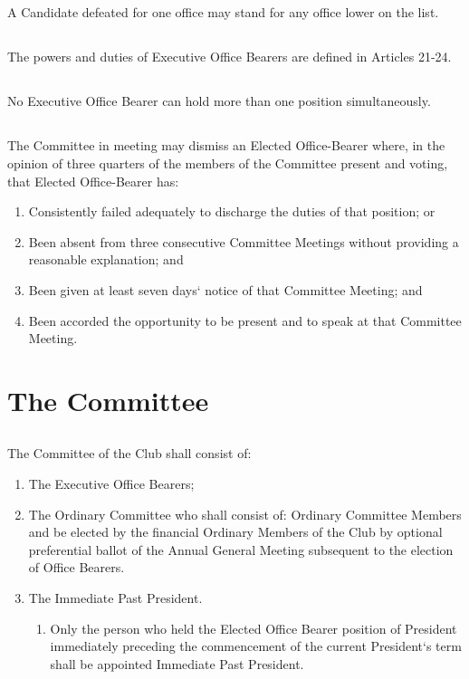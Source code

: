 \documentclass[10.5pt]{article}
\begin{document}
\subsection{} A Candidate defeated for one office may stand for any office lower on the list. 
\subsection{} The powers and duties of Executive Office Bearers are defined in Articles 21-24. 
\subsection{} No Executive Office Bearer can hold more than one position simultaneously.
\subsection{} The Committee in meeting may dismiss an Elected Office-Bearer where, in the opinion of
three quarters of the members of the Committee present and voting, that Elected Office-Bearer has:

\begin{enumerate}[label=(\alph*)]
    \item Consistently failed adequately to discharge the duties of that position; or
    \item Been absent from three consecutive Committee Meetings without providing a reasonable explanation; and
    \item Been given at least seven days‘ notice of that Committee Meeting; and
    \item Been accorded the opportunity to be present and to speak at that Committee Meeting.
    \newline
\end{enumerate}

\section{The Committee}
\subsection{} The Committee of the Club shall consist of:
\begin{enumerate}[label=(\alph*)]
    \item The Executive Office Bearers;
    \item The Ordinary Committee who shall consist of: Ordinary Committee Members and be elected by the financial Ordinary Members of the Club by optional preferential ballot of the Annual General Meeting subsequent to the election of Office Bearers.
    \item The Immediate Past President.
    \begin{enumerate}[label=(\roman*)]
        \item Only the person who held the Elected Office Bearer position of President immediately preceding the commencement of the current President‘s term shall be appointed Immediate Past President. 
        \newline
    \end{enumerate}
\end{enumerate}
\end{document}
